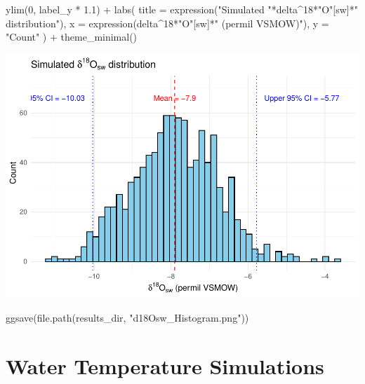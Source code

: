 \documentclass[
]{article}
\newenvironment{Shaded}{\begin{snugshade}}{\end{snugshade}}
\newcommand{\AttributeTok}[1]{\textcolor[rgb]{0.77,0.63,0.00}{#1}}
\newcommand{\DecValTok}[1]{\textcolor[rgb]{0.00,0.00,0.81}{#1}}
\newcommand{\FloatTok}[1]{\textcolor[rgb]{0.00,0.00,0.81}{#1}}
\newcommand{\FunctionTok}[1]{\textcolor[rgb]{0.00,0.00,0.00}{#1}}
\newcommand{\NormalTok}[1]{#1}
\newcommand{\SpecialCharTok}[1]{\textcolor[rgb]{0.00,0.00,0.00}{#1}}
\newcommand{\StringTok}[1]{\textcolor[rgb]{0.31,0.60,0.02}{#1}}
\begin{document}
\begin{Shaded}
\begin{Highlighting}[]
  \FunctionTok{ylim}\NormalTok{(}\DecValTok{0}\NormalTok{, label\_y }\SpecialCharTok{*} \FloatTok{1.1}\NormalTok{) }\SpecialCharTok{+}
  \FunctionTok{labs}\NormalTok{(}
    \AttributeTok{title =} \FunctionTok{expression}\NormalTok{(}\StringTok{"Simulated "}\SpecialCharTok{*}\NormalTok{delta}\SpecialCharTok{\^{}}\DecValTok{18}\SpecialCharTok{*}\StringTok{"O"}\NormalTok{[sw]}\SpecialCharTok{*}\StringTok{" distribution"}\NormalTok{),}
    \AttributeTok{x =} \FunctionTok{expression}\NormalTok{(delta}\SpecialCharTok{\^{}}\DecValTok{18}\SpecialCharTok{*}\StringTok{"O"}\NormalTok{[sw]}\SpecialCharTok{*}\StringTok{" (permil VSMOW)"}\NormalTok{),}
    \AttributeTok{y =} \StringTok{"Count"}
\NormalTok{  ) }\SpecialCharTok{+}
  \FunctionTok{theme\_minimal}\NormalTok{()}
\end{Highlighting}
\end{Shaded}

\includegraphics{V1075_MonteCarlo_Report_files/figure-latex/unnamed-chunk-3-1.pdf}

\begin{Shaded}
\begin{Highlighting}[]
\FunctionTok{ggsave}\NormalTok{(}\FunctionTok{file.path}\NormalTok{(results\_dir, }\StringTok{"d18Osw\_Histogram.png"}\NormalTok{))}
\end{Highlighting}
\end{Shaded}

\hypertarget{water_temperature_simulations}{%
\section{Water Temperature
Simulations}\label{water_temperature_simulations}}
\end{document}
